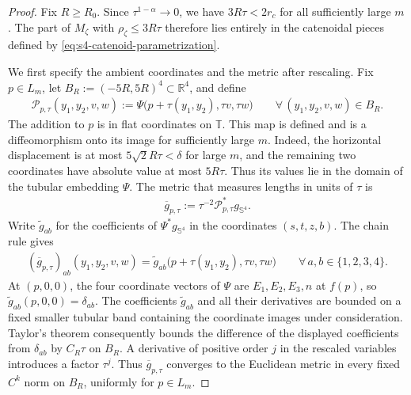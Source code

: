 \documentclass[a4paper,11pt,oneside,reqno]{amsart}
\numberwithin{equation}{section}
\theoremstyle{definition}
\begin{document}
\begin{proof}
    Fix $R\geq R_0$. Since $\tau^{1-\alpha}\to0$, we have
    $3R\tau<2r_c$ for all sufficiently large $m$. The part
    of $M_\zeta$ with $\rho_\zeta\leq3R\tau$ therefore lies
    entirely in the catenoidal pieces defined by
    \eqref{eq:s4-catenoid-parametrization}.

    We first specify the ambient coordinates and the metric
    after rescaling. Fix $p\in L_m$, let
    $B_R:=(-5R,5R)^4\subset\mathbb R^4$, and define
    \begin{align*}
        \mathcal P_{p,\tau}(y_1,y_2,v,w)
        :=\Psi\bigl(p+\tau(y_1,y_2),\tau v,\tau w\bigr)
        \qquad\forall\,(y_1,y_2,v,w)\in B_R.
    \end{align*}
    The addition to $p$ is in flat coordinates on $\mathbb T$.
    This map is defined and is a diffeomorphism onto its
    image for sufficiently large $m$. Indeed, the horizontal
    displacement is at most $5\sqrt2R\tau<\delta$ for large
    $m$, and the remaining two coordinates have absolute
    value at most $5R\tau$. Thus its values lie in the
    domain of the tubular embedding $\Psi$.
    The metric that measures lengths in units of $\tau$ is
    \begin{align*}
        \overline g_{p,\tau}
        :=\tau^{-2}\mathcal P_{p,\tau}^*g_{\mathbb S^4}.
    \end{align*}
    Write $\widetilde g_{ab}$ for the coefficients of
    $\Psi^*g_{\mathbb S^4}$ in the coordinates $(s,t,z,b)$.
    The chain rule gives
    \begin{align*}
        (\overline g_{p,\tau})_{ab}(y_1,y_2,v,w)
        =\widetilde g_{ab}
          \bigl(p+\tau(y_1,y_2),\tau v,\tau w\bigr)
        \qquad\forall\,a,b\in\{1,2,3,4\}.
    \end{align*}
    At $(p,0,0)$, the four coordinate vectors of $\Psi$
    are $E_1,E_2,E_3,n$ at $f(p)$, so
    $\widetilde g_{ab}(p,0,0)=\delta_{ab}$. The coefficients
    $\widetilde g_{ab}$ and all their derivatives are bounded
    on a fixed smaller tubular band containing the coordinate
    images under consideration. Taylor's theorem consequently
    bounds the difference of the displayed coefficients from
    $\delta_{ab}$ by $C_R\tau$ on $B_R$. A derivative
    of positive order $j$ in the rescaled variables introduces
    a factor $\tau^j$. Thus $\overline g_{p,\tau}$ converges
    to the Euclidean metric in every fixed $C^k$ norm on
    $B_R$, uniformly for $p\in L_m$.


\end{proof}
\end{document}

